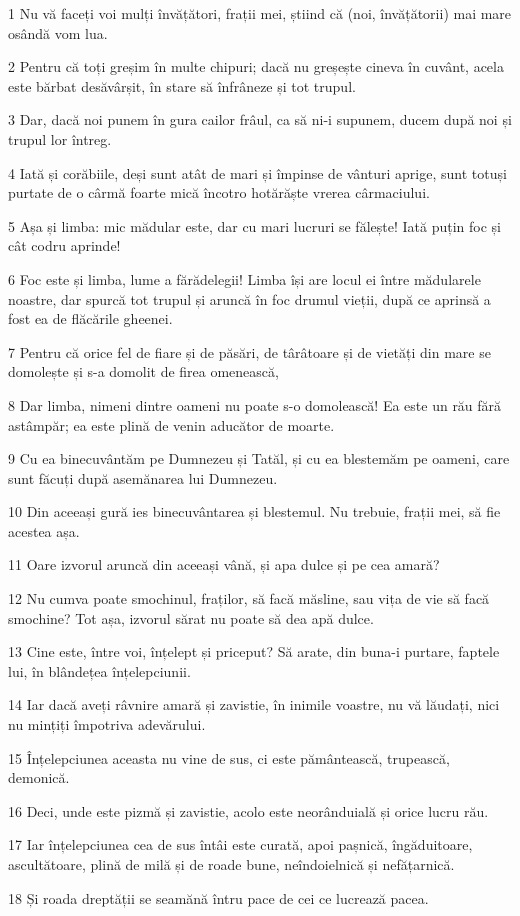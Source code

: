 \par 1 Nu vă faceți voi mulți învățători, frații mei, știind că (noi, învățătorii) mai mare osândă vom lua.
\par 2 Pentru că toți greșim în multe chipuri; dacă nu greșește cineva în cuvânt, acela este bărbat desăvârșit, în stare să înfrâneze și tot trupul.
\par 3 Dar, dacă noi punem în gura cailor frâul, ca să ni-i supunem, ducem după noi și trupul lor întreg.
\par 4 Iată și corăbiile, deși sunt atât de mari și împinse de vânturi aprige, sunt totuși purtate de o cârmă foarte mică încotro hotărăște vrerea cârmaciului.
\par 5 Așa și limba: mic mădular este, dar cu mari lucruri se fălește! Iată puțin foc și cât codru aprinde!
\par 6 Foc este și limba, lume a fărădelegii! Limba își are locul ei între mădularele noastre, dar spurcă tot trupul și aruncă în foc drumul vieții, după ce aprinsă a fost ea de flăcările gheenei.
\par 7 Pentru că orice fel de fiare și de păsări, de târâtoare și de vietăți din mare se domolește și s-a domolit de firea omenească,
\par 8 Dar limba, nimeni dintre oameni nu poate s-o domolească! Ea este un rău fără astâmpăr; ea este plină de venin aducător de moarte.
\par 9 Cu ea binecuvântăm pe Dumnezeu și Tatăl, și cu ea blestemăm pe oameni, care sunt făcuți după asemănarea lui Dumnezeu.
\par 10 Din aceeași gură ies binecuvântarea și blestemul. Nu trebuie, frații mei, să fie acestea așa.
\par 11 Oare izvorul aruncă din aceeași vână, și apa dulce și pe cea amară?
\par 12 Nu cumva poate smochinul, fraților, să facă măsline, sau vița de vie să facă smochine? Tot așa, izvorul sărat nu poate să dea apă dulce.
\par 13 Cine este, între voi, înțelept și priceput? Să arate, din buna-i purtare, faptele lui, în blândețea înțelepciunii.
\par 14 Iar dacă aveți râvnire amară și zavistie, în inimile voastre, nu vă lăudați, nici nu mințiți împotriva adevărului.
\par 15 Înțelepciunea aceasta nu vine de sus, ci este pământească, trupească, demonică.
\par 16 Deci, unde este pizmă și zavistie, acolo este neorânduială și orice lucru rău.
\par 17 Iar înțelepciunea cea de sus întâi este curată, apoi pașnică, îngăduitoare, ascultătoare, plină de milă și de roade bune, neîndoielnică și nefățarnică.
\par 18 Și roada dreptății se seamănă întru pace de cei ce lucrează pacea.


